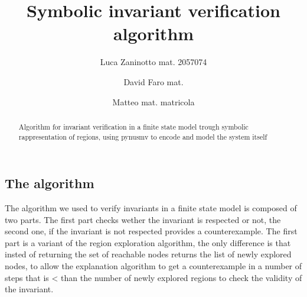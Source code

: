 \documentclass[9pt,oneside]{amsart}
\title{Symbolic invariant verification algorithm}
\author{
  Luca Zaninotto mat. 2057074 
  \and
  David Faro mat. 
  \and
  Matteo mat.
  matricola
}
\begin{document}
\begin{abstract}
  Algorithm for invariant verification in a finite state model trough
  symbolic rappresentation of regions, using pynusmv to encode and
  model the system itself
\end{abstract}
\maketitle
\setlength{\columnsep}{20pt}
\begin{multicols}{2}
\section{The algorithm}\label{algo}
The algorithm we used to verify invariants in a finite state model is
composed of two parts. The first part checks wether the invariant is
respected or not, the second one, if the invariant is not respected
provides a counterexample. The first part is a variant of the region
exploration algorithm, the only difference is that insted of returning
the set of reachable nodes returns the list of newly explored nodes,
to allow the explanation algorithm to get a counterexample in a number
of steps that is < than the number of newly explored regions to check
the validity of the invariant.


\end{multicols}
\end{document}
